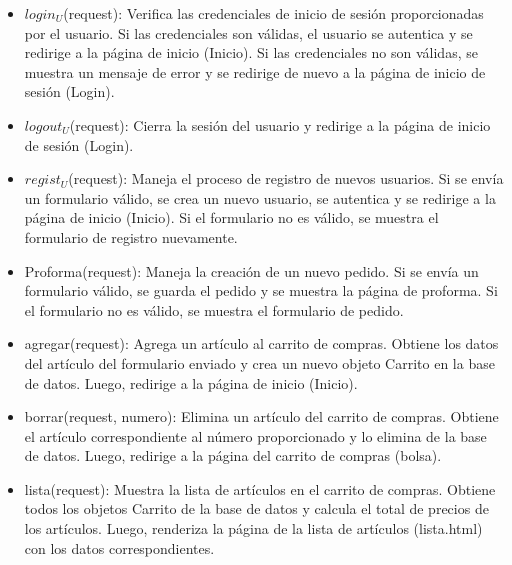 \documentclass{article}
\begin{document}
	\begin{itemize}
	    \item $login_U$(request): Verifica las credenciales de inicio de sesión proporcionadas por el usuario. Si las credenciales son válidas, el usuario se autentica y se redirige a la página de inicio (Inicio). Si las credenciales no son válidas, se muestra un mensaje de error y se redirige de nuevo a la página de inicio de sesión (Login).
        \item $logout_U$(request): Cierra la sesión del usuario y redirige a la página de inicio de sesión (Login).
        \item $regist_U$(request): Maneja el proceso de registro de nuevos usuarios. Si se envía un formulario válido, se crea un nuevo usuario, se autentica y se redirige a la página de inicio (Inicio). Si el formulario no es válido, se muestra el formulario de registro nuevamente.
        \item Proforma(request): Maneja la creación de un nuevo pedido. Si se envía un formulario válido, se guarda el pedido y se muestra la página de proforma. Si el formulario no es válido, se muestra el formulario de pedido.
        \item agregar(request): Agrega un artículo al carrito de compras. Obtiene los datos del artículo del formulario enviado y crea un nuevo objeto Carrito en la base de datos. Luego, redirige a la página de inicio (Inicio).
        \item borrar(request, numero): Elimina un artículo del carrito de compras. Obtiene el artículo correspondiente al número proporcionado y lo elimina de la base de datos. Luego, redirige a la página del carrito de compras (bolsa).
        \item lista(request): Muestra la lista de artículos en el carrito de compras. Obtiene todos los objetos Carrito de la base de datos y calcula el total de precios de los artículos. Luego, renderiza la página de la lista de artículos (lista.html) con los datos correspondientes.
    \end{itemize}
\end{document}
